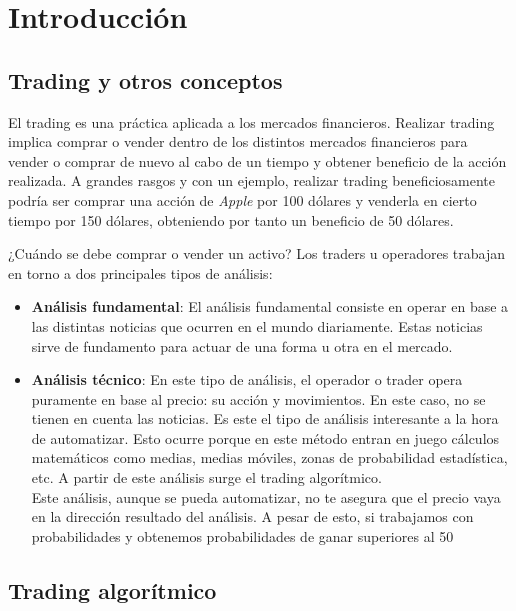 
\chapter{Introducción}

\section{Trading y otros conceptos}

El trading es una práctica aplicada a los mercados financieros. Realizar trading implica comprar o vender dentro de los distintos mercados financieros para vender o comprar de nuevo al cabo de un tiempo y obtener beneficio de la acción realizada. A grandes rasgos y con un ejemplo, realizar trading beneficiosamente podría ser comprar una acción de \textit{Apple} por 100 dólares y venderla en cierto tiempo por 150 dólares, obteniendo por tanto un beneficio de 50 dólares. \newline

¿Cuándo se debe comprar o vender un activo? Los traders u operadores trabajan en torno a dos principales tipos de análisis:

\begin{itemize}

	\item \textbf{Análisis fundamental}: El análisis fundamental consiste en operar en base a las distintas noticias que ocurren en el mundo diariamente. Estas noticias sirve de fundamento para actuar de una forma u otra en el mercado.
	\item \textbf{Análisis técnico}: En este tipo de análisis, el operador o trader opera puramente en base al precio: su acción y movimientos. En este caso, no se tienen en cuenta las noticias. Es este el tipo de análisis interesante a la hora de automatizar. Esto ocurre porque en este método entran en juego cálculos matemáticos como medias, medias móviles, zonas de probabilidad estadística, etc. A partir de este análisis surge el trading algorítmico. \\
	Este análisis, aunque se pueda automatizar, no te asegura que el precio vaya en la dirección resultado del análisis. A pesar de esto, si trabajamos con probabilidades y obtenemos probabilidades de ganar superiores al 50%
	
\end{itemize}

\section{Trading algorítmico}

